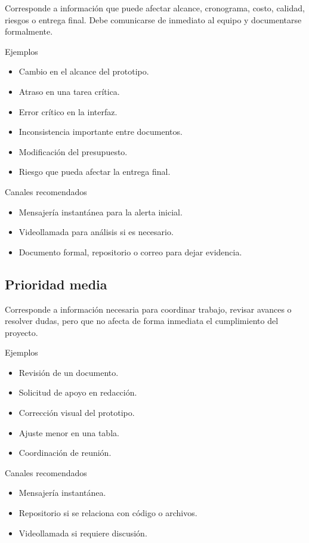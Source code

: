 \documentclass[11pt,spanish]{article}
\begin{document}
Corresponde a información que puede afectar alcance, cronograma, costo, calidad, riesgos o entrega final. Debe comunicarse de inmediato al equipo y documentarse formalmente.

\noindent Ejemplos

\begin{itemize}
    \item Cambio en el alcance del prototipo.
    \item Atraso en una tarea crítica.
    \item Error crítico en la interfaz.
    \item Inconsistencia importante entre documentos.
    \item Modificación del presupuesto.
    \item Riesgo que pueda afectar la entrega final.
\end{itemize}

\noindent Canales recomendados

\begin{itemize}
    \item Mensajería instantánea para la alerta inicial.
    \item Videollamada para análisis si es necesario.
    \item Documento formal, repositorio o correo para dejar evidencia.
\end{itemize}

\subsection{Prioridad media}

Corresponde a información necesaria para coordinar trabajo, revisar avances o resolver dudas, pero que no afecta de forma inmediata el cumplimiento del proyecto.

\noindent Ejemplos

\begin{itemize}
    \item Revisión de un documento.
    \item Solicitud de apoyo en redacción.
    \item Corrección visual del prototipo.
    \item Ajuste menor en una tabla.
    \item Coordinación de reunión.
\end{itemize}

\noindent Canales recomendados

\begin{itemize}
    \item Mensajería instantánea.
    \item Repositorio si se relaciona con código o archivos.
    \item Videollamada si requiere discusión.
\end{itemize}
\end{document}
